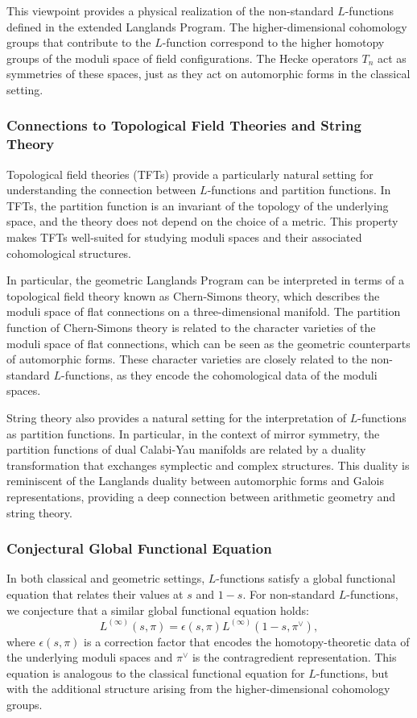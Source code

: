 \documentclass{article}
\theoremstyle{remark}
\begin{document}
This viewpoint provides a physical realization of the non-standard $L$-functions defined in the extended Langlands Program. The higher-dimensional cohomology groups that contribute to the $L$-function correspond to the higher homotopy groups of the moduli space of field configurations. The Hecke operators $T_n$ act as symmetries of these spaces, just as they act on automorphic forms in the classical setting.

\subsubsection{Connections to Topological Field Theories and String Theory}

Topological field theories (TFTs) provide a particularly natural setting for understanding the connection between $L$-functions and partition functions. In TFTs, the partition function is an invariant of the topology of the underlying space, and the theory does not depend on the choice of a metric. This property makes TFTs well-suited for studying moduli spaces and their associated cohomological structures.

In particular, the geometric Langlands Program can be interpreted in terms of a topological field theory known as Chern-Simons theory, which describes the moduli space of flat connections on a three-dimensional manifold. The partition function of Chern-Simons theory is related to the character varieties of the moduli space of flat connections, which can be seen as the geometric counterparts of automorphic forms. These character varieties are closely related to the non-standard $L$-functions, as they encode the cohomological data of the moduli spaces.

String theory also provides a natural setting for the interpretation of $L$-functions as partition functions. In particular, in the context of mirror symmetry, the partition functions of dual Calabi-Yau manifolds are related by a duality transformation that exchanges symplectic and complex structures. This duality is reminiscent of the Langlands duality between automorphic forms and Galois representations, providing a deep connection between arithmetic geometry and string theory.

\subsubsection{Conjectural Global Functional Equation}

In both classical and geometric settings, $L$-functions satisfy a global functional equation that relates their values at $s$ and $1-s$. For non-standard $L$-functions, we conjecture that a similar global functional equation holds:
\[
L^{(\infty)}(s, \pi) = \epsilon(s, \pi) L^{(\infty)}(1-s, \pi^\vee),
\]
where $\epsilon(s, \pi)$ is a correction factor that encodes the homotopy-theoretic data of the underlying moduli spaces and $\pi^\vee$ is the contragredient representation. This equation is analogous to the classical functional equation for $L$-functions, but with the additional structure arising from the higher-dimensional cohomology groups.
\end{document}
